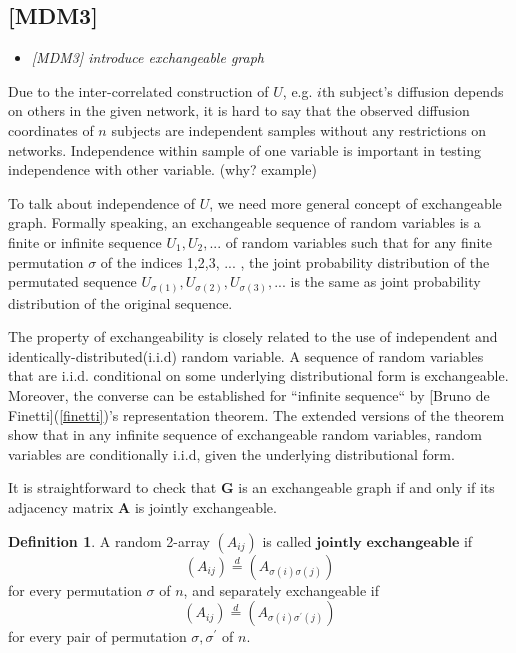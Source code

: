 \documentclass[12pt]{article}
\theoremstyle{definition}
\newtheorem{definition}{Definition}[section]
\begin{document}
\subsection{[MDM3]}
\begin{itemize}
	\item {\it  [MDM3] introduce exchangeable graph \/}
\end{itemize}


Due to the inter-correlated construction of $U$, e.g. $i$th subject's diffusion depends on others in the given network, it is hard to say that the observed diffusion coordinates of $n$ subjects are independent samples without any restrictions on networks. Independence within sample of one variable is important in testing independence with other variable. (why? example)

To talk about independence of $U$, we need more general concept of exchangeable graph. Formally speaking, an exchangeable sequence of random variables is a finite or infinite sequence $U_{1}, U_{2}, ...$ of random variables such that for any finite permutation $\sigma$ of the indices 1,2,3, ... , the joint probability distribution of the permutated sequence 
$U_{\sigma(1)}, U_{\sigma(2)}, U_{\sigma(3)}, ...$
is the same as joint probability distribution of the original sequence. 

The property of exchangeability is closely related to the use of independent and identically-distributed(i.i.d) random variable. A sequence of random variables that are i.i.d. conditional on some underlying distributional form is exchangeable. 
Moreover, the converse can be established for ``infinite sequence`` by [Bruno de Finetti](\ref{finetti})'s representation theorem. The extended versions of the theorem show that in any infinite sequence of exchangeable random variables, random variables are conditionally i.i.d, given the underlying distributional form.

It is straightforward to check that $\mathbf{G}$ is an exchangeable graph if and only if its adjacency matrix $\mathbf{A}$ is jointly exchangeable.  

\begin{definition}
A random 2-array $(A_{ij})$ is called $\mathbf{\mbox{jointly exchangeable}}$ if 
$$(A_{ij}) \stackrel{d}{=} (A_{\sigma(i) \sigma(j)})$$
for every permutation $\sigma$ of $n$,
and separately exchangeable if 
$$(A_{ij}) \stackrel{d}{=} (A_{\sigma(i) \sigma^{\prime}(j) })$$
for every pair of permutation $\sigma, \sigma^{\prime}$ of $n$.
\end{definition}
\end{document}
